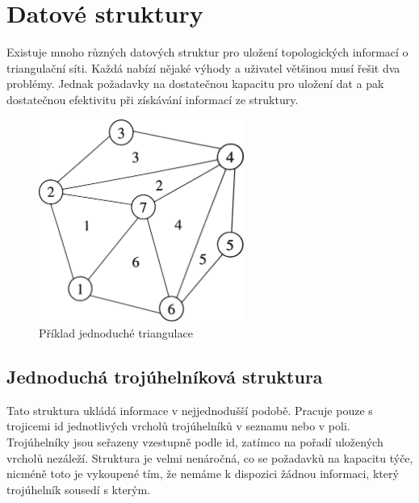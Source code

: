 \documentclass[12pt,a4paper]{article}
\begin{document}
\newpage
\section{Datové struktury}
\label{sec:data_struct}

Existuje mnoho různých datových struktur pro uložení topologických
informací o triangulační síti. Každá nabízí nějaké výhody a uživatel
většinou musí řešit dva problémy. Jednak požadavky na dostatečnou
kapacitu pro uložení dat a pak dostatečnou efektivitu při získávání
informací ze struktury.

\begin{figure}[h!]
\centering
\includegraphics[width=0.6\textwidth]{img/data_struct.png}
\caption{Příklad jednoduché triangulace}
\label{fig:struct_triangulace}
\end{figure}

\newpage
\subsection{Jednoduchá trojúhelníková struktura}

Tato struktura ukládá informace v nejjednodušší podobě. Pracuje pouze
s trojicemi id jednotlivých vrcholů trojúhelníků v seznamu nebo v
poli. Trojúhelníky jsou seřazeny vzestupně podle id, zatímco na pořadí
uložených vrcholů nezáleží. Struktura je velmi nenáročná, co se
požadavků na kapacitu týče, nicméně toto je vykoupené tím, že nemáme k
dispozici žádnou informaci, který trojúhelník sousedí s kterým.
\end{document}

